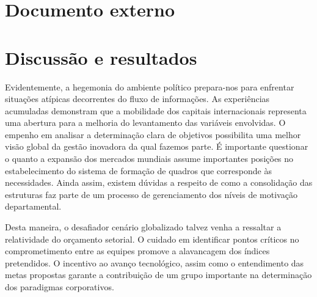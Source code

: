 \documentclass[10pt,a4paper,twoside]{article}
\begin{document}
	\section{Documento externo}
	
	
	
	
	\section{Discussão e resultados}
	
	Evidentemente, a hegemonia do ambiente político prepara-nos para enfrentar situações atípicas decorrentes do fluxo de informações. As experiências acumuladas demonstram que a mobilidade dos capitais internacionais representa uma abertura para a melhoria do levantamento das variáveis envolvidas. O empenho em analisar a determinação clara de objetivos possibilita uma melhor visão global da gestão inovadora da qual fazemos parte. É importante questionar o quanto a expansão dos mercados mundiais assume importantes posições no estabelecimento do sistema de formação de quadros que corresponde às necessidades. Ainda assim, existem dúvidas a respeito de como a consolidação das estruturas faz parte de um processo de gerenciamento dos níveis de motivação departamental. 
	
	Desta maneira, o desafiador cenário globalizado talvez venha a ressaltar a relatividade do orçamento setorial. O cuidado em identificar pontos críticos no comprometimento entre as equipes promove a alavancagem dos índices pretendidos. O incentivo ao avanço tecnológico, assim como o entendimento das metas propostas garante a contribuição de um grupo importante na determinação dos paradigmas corporativos. 
	
\end{document}

